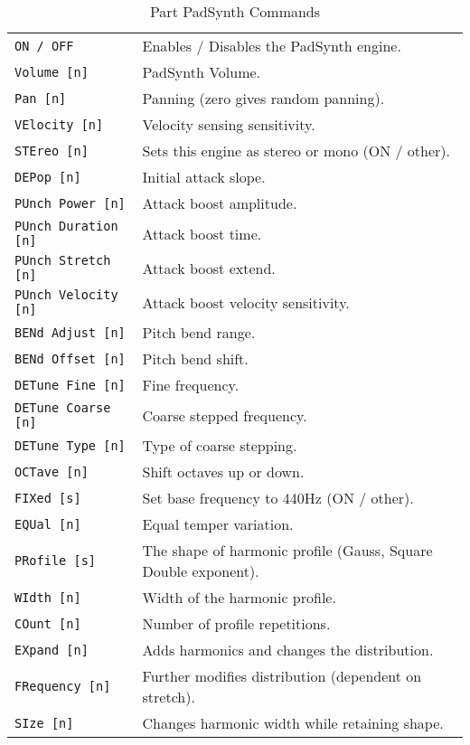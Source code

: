    \begin{table}[H]
      \centering
      \caption{Part PadSynth Commands}
      \label{table:yoshimi_part_padsynth_commands}
      \begin{tabular}{l l}
\texttt{ON / OFF} &
   Enables / Disables the PadSynth engine. \\
\texttt{Volume [n]} &
   PadSynth Volume. \\
\texttt{Pan [n]} &
   Panning (zero gives random panning).\\
\texttt{VElocity [n]} &
   Velocity sensing sensitivity. \\
\texttt{STEreo [n]} &
   Sets this engine as stereo or mono (ON / other). \\
\texttt{DEPop [n]} &
   Initial attack slope.   \\
\texttt{PUnch Power [n]} &
   Attack boost amplitude. \\
\texttt{PUnch Duration [n]} &
   Attack boost time. \\
\texttt{PUnch Stretch [n]} &
   Attack boost extend. \\
\texttt{PUnch Velocity [n]} &
   Attack boost velocity sensitivity. \\
\texttt{BENd Adjust [n]} &
   Pitch bend range. \\
\texttt{BENd Offset [n]} &
   Pitch bend shift. \\
\texttt{DETune Fine [n]} &
   Fine frequency. \\
\texttt{DETune Coarse [n]} &
   Coarse stepped frequency. \\
\texttt{DETune Type [n]} &
   Type of coarse stepping. \\
\texttt{OCTave [n]} &
   Shift octaves up or down. \\
\texttt{FIXed [s]} &
   Set base frequency to 440Hz (ON / other). \\
\texttt{EQUal [n]} &
   Equal temper variation. \\
\texttt{PRofile [s]} &
   The shape of harmonic profile (Gauss, Square Double exponent). \\
\texttt{WIdth [n]} &
   Width of the harmonic profile. \\
\texttt{COunt [n]} &
   Number of profile repetitions. \\
\texttt{EXpand [n]} &
   Adds harmonics and changes the distribution. \\
\texttt{FRequency [n]} &
   Further modifies distribution (dependent on stretch). \\
\texttt{SIze [n]} &
   Changes harmonic width while retaining shape. \\

\end{tabular}
\end{table}

